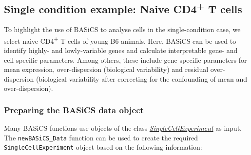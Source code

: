 \documentclass[9pt,a4paper,]{extarticle}
\newenvironment{Shaded}{\begin{snugshade}}{\end{snugshade}}
\newcommand{\CommentTok}[1]{\textcolor[rgb]{0.56,0.35,0.01}{\textit{#1}}}
\newcommand{\DataTypeTok}[1]{\textcolor[rgb]{0.13,0.29,0.53}{#1}}
\newcommand{\KeywordTok}[1]{\textcolor[rgb]{0.13,0.29,0.53}{\textbf{#1}}}
\newcommand{\NormalTok}[1]{#1}
\newcommand{\OperatorTok}[1]{\textcolor[rgb]{0.81,0.36,0.00}{\textbf{#1}}}
\newcommand{\StringTok}[1]{\textcolor[rgb]{0.31,0.60,0.02}{#1}}
\begin{document}
\begin{Shaded}
\end{Shaded}

\hypertarget{Tcells-single}{%
\subsection{\texorpdfstring{Single condition example: Naive CD4\textsuperscript{+} T cells}{Single condition example: Naive CD4+ T cells}}\label{Tcells-single}}

To highlight the use of BASiCS to analyse cells in the single-condition case,
we select naive CD4\textsuperscript{+} T cells of young B6 animals.
Here, BASiCS can be used to identify highly- and lowly-variable genes and
calculate interpretable gene- and cell-specific parameters.
Among others, these include gene-specific parameters for mean expression,
over-dispersion (biological variability) and residual over-dispersion
(biological variability after correcting for the confounding of mean and
over-dispersion).

\hypertarget{Tcells-filtering}{%
\subsubsection{Preparing the BASiCS data object}\label{Tcells-filtering}}

Many BASiCS functions use objects of the class
\emph{\href{https://bioconductor.org/packages/3.11/SingleCellExperiment}{SingleCellExperiment}} as input.
The \texttt{newBASiCS\_Data} function can be used to create the required
\texttt{SingleCellExperiment} object based on the following information:
\end{document}
